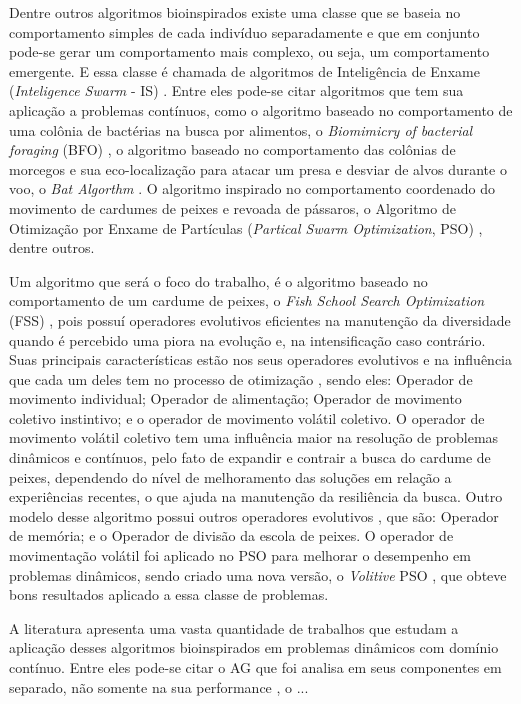 Dentre outros algoritmos bioinspirados existe uma classe que se baseia no comportamento simples de cada indivíduo separadamente e que em conjunto pode-se gerar um comportamento mais complexo, ou seja, um comportamento emergente. E essa classe é chamada de algoritmos de Inteligência de Enxame (\textit{Inteligence Swarm} - IS) \cite{parpinelli2011new}. Entre eles pode-se citar algoritmos que tem sua aplicação a problemas contínuos, como o algoritmo baseado no comportamento de uma colônia de bactérias na busca por alimentos, o \textit{Biomimicry of bacterial foraging} (BFO) \cite{passino2002biomimicry}, o algoritmo baseado no comportamento das colônias de morcegos e sua eco-localização para atacar um presa e desviar de alvos durante o voo, o \textit{Bat Algorthm} \cite{bat}. O algoritmo inspirado no comportamento coordenado do movimento de cardumes de peixes e revoada de pássaros, o Algoritmo de Otimização por Enxame de Partículas (\textit{Partical Swarm Optimization}, PSO) \cite{pso}, dentre outros.

Um algoritmo que será o foco do trabalho, é o algoritmo baseado no comportamento de um cardume de peixes, o \textit{Fish School Search Optimization} (FSS) \cite{carmelo2008novel}, pois possuí operadores evolutivos eficientes na manutenção da diversidade quando é percebido uma piora na evolução e, na intensificação caso contrário. Suas principais características estão nos seus operadores evolutivos e na influência que cada um deles tem no processo de otimização \cite{c2009influence}, sendo eles: Operador de movimento individual; Operador de alimentação; Operador de movimento coletivo instintivo; e o operador de movimento volátil coletivo. O operador de movimento volátil coletivo tem uma influência maior na resolução de problemas dinâmicos e contínuos, pelo fato de expandir e contrair a busca do cardume de peixes, dependendo do nível de melhoramento das soluções em relação a experiências recentes, o que ajuda na manutenção da resiliência da busca. Outro modelo desse algoritmo possui outros operadores evolutivos \cite{madeiro2011density}, que são: Operador de memória; e o Operador de divisão da escola de peixes. O operador de movimentação volátil foi aplicado no PSO para melhorar o desempenho em problemas dinâmicos, sendo criado uma nova versão, o \textit{Volitive} PSO \cite{cavalcanti2011hybrid}, que obteve bons resultados aplicado a essa classe de problemas.

A literatura apresenta uma vasta quantidade de trabalhos que estudam a aplicação desses algoritmos bioinspirados em problemas dinâmicos com domínio contínuo. Entre eles pode-se citar o AG que foi analisa em seus componentes em separado, não somente na sua performance \cite{rand2005measurements}, o ...


